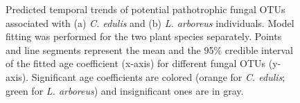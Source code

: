 \clearpage
\begin{figure}[h]
	\vspace*{-1cm}
	\centering
	\caption[Predicted temporal trends of potential pathotrophic fungal OTUs associated with \textit{C. edulis} and \textit{L. arboreus} individuals.]
		{\hspace{1mm} Predicted temporal trends of potential pathotrophic fungal OTUs associated with (a) \textit{C. edulis} and (b) \textit{L. arboreus} individuals. Model fitting was performed for the two plant species separately. Points and line segments represent the mean and the 95$\%$ credible interval of the fitted age coefficient (x-axis) for different fungal OTUs (y-axis). Significant age coefficients are colored (orange for \textit{C. edulis}; green for \textit{L. arboreus}) and insignificant ones are in gray.}
		\label{fig:Funguild_HMSC_Species_Individual_Full2015Pathogen}
\end{figure}


